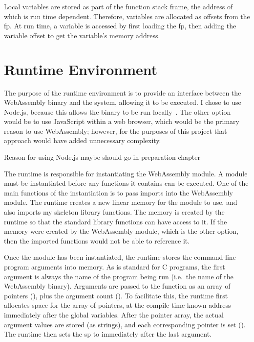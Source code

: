 \documentclass[00-main.tex]{subfiles}
\begin{document}
Local variables are stored as part of the function stack frame, the address of which is run time dependent.
Therefore, variables are allocated as offsets from the \gls{fp}.
At run time, a variable is accessed by first loading the \gls{fp}, then adding the variable offset to get the variable's memory address.

\section{Runtime Environment}\label{sec:impl:runtime}

The purpose of the runtime environment is to provide an interface between the WebAssembly binary and the system, allowing it to be executed.
I chose to use Node.js, because this allows the binary to be run locally~.
The other option would be to use JavaScript within a web browser, which would be the primary reason to use WebAssembly; however, for the purposes of this project that approach would have added unnecessary complexity.

\begin{mrwComment}
Reason for using Node.js maybe should go in preparation chapter
\end{mrwComment}

The runtime is responsible for instantiating the WebAssembly module.
A module must be instantiated before any functions it contains can be executed.
One of the main functions of the instantiation is to pass imports into the WebAssembly module.
The runtime creates a new linear memory for the module to use, and also imports my skeleton library functions.
The memory is created by the runtime so that the standard library functions can have access to it.
If the memory were created by the WebAssembly module, which is the other option, then the imported functions would not be able to reference it.

Once the module has been instantiated, the runtime stores the command-line program arguments into memory.
As is standard for C programs, the first argument is always the name of the program being run (i.e.\ the name of the WebAssembly binary).
Arguments are passed to the  function as an array of  pointers (), plus the argument count ().
To facilitate this, the runtime first allocates space for the array of pointers, at the compile-time known address immediately after the global variables.
After the pointer array, the actual argument values are stored (as strings), and each corresponding pointer is set ().
The runtime then sets the \gls{sp} to immediately after the last argument.
\end{document}
